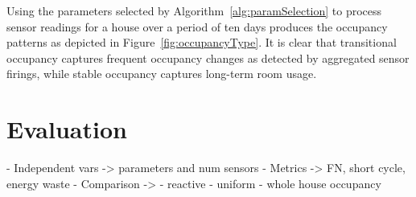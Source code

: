 Using the parameters selected by Algorithm~\ref{alg:paramSelection} to process
sensor readings for a house over a period of ten days produces the occupancy
patterns as depicted in Figure~\ref{fig:occupancyType}. It is clear that
transitional occupancy captures frequent occupancy changes as detected by
aggregated sensor firings, while stable occupancy captures long-term room usage.


\section{Evaluation}

- Independent vars -> parameters and num sensors
- Metrics -> FN, short cycle, energy waste
- Comparison -> - reactive
                - uniform
                - whole house occupancy
